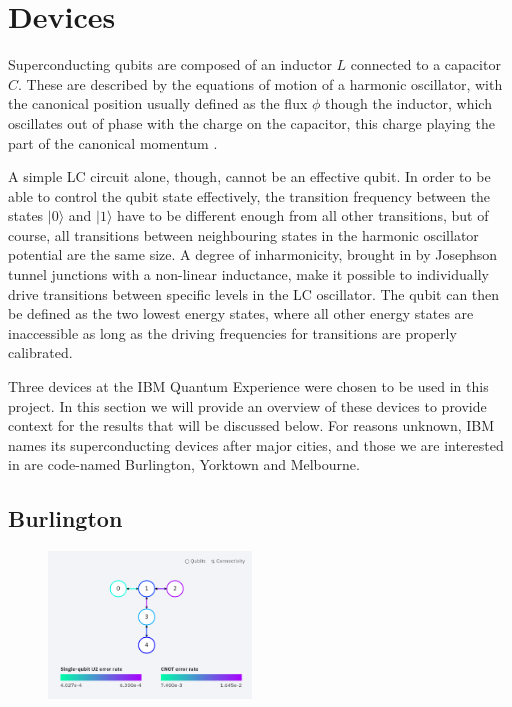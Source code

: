 \section{Devices}
Superconducting qubits are composed of an inductor $L$ connected to a capacitor
$C$. These are described by the equations of motion of a harmonic oscillator,
with the canonical position usually defined as the flux $\phi$ though the
inductor, which oscillates out of phase with the charge on the capacitor, this
charge playing the part of the canonical momentum
\cite{devoret04_implem_qubit_with_super_integ_circuit}.

A simple LC circuit alone, though, cannot be an effective qubit. In order to be
able to control the qubit state effectively, the transition frequency between
the states $|0\rangle$ and $|1\rangle$ have to be different enough from all
other transitions, but of course, all transitions between neighbouring states in
the harmonic oscillator potential are the same size. A degree of inharmonicity,
brought in by Josephson tunnel junctions with a non-linear inductance, make it
possible to individually drive transitions between specific levels in the LC
oscillator. The qubit can then be defined as the two lowest energy states, where
all other energy states are inaccessible as long as the driving frequencies for
transitions are properly calibrated.

Three devices at the IBM Quantum Experience were chosen to be used in this
project. In this section we will provide an overview of these devices to provide
context for the results that will be discussed below. For reasons unknown, IBM names its
superconducting devices after major cities, and those we are interested in are code-named
Burlington, Yorktown and Melbourne.

\subsection{Burlington}


\begin{figure}[h]
  \includegraphics[width=0.48\textwidth]{images/connection_diagram_burlington.png}
\end{figure}


